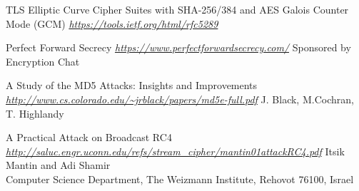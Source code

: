 \documentclass{article}
\begin{document}
\begin{thebibliography}{9}

  TLS Elliptic Curve Cipher Suites with SHA-256/384 and AES Galois Counter Mode (GCM)
  \emph{\url{https://tools.ietf.org/html/rfc5289}}
  
  Perfect Forward Secrecy
  \emph{\url{https://www.perfectforwardsecrecy.com/}}
  Sponsored by Encryption Chat

  A Study of the MD5 Attacks: Insights and Improvements
  \emph{\url{http://www.cs.colorado.edu/~jrblack/papers/md5e-full.pdf}}
  J. Black, M.Cochran, T. Highlandy
  
  A Practical Attack on Broadcast RC4
  \emph{\url{http://saluc.engr.uconn.edu/refs/stream_cipher/mantin01attackRC4.pdf}}
  Itsik Mantin and Adi Shamir\\
  Computer Science Department, The Weizmann Institute, Rehovot 76100, Israel
  
\end{thebibliography}
\end{document}
